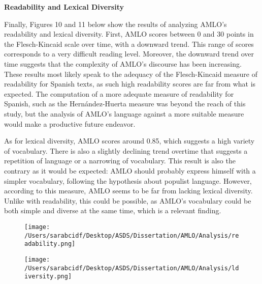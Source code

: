 \documentclass[]{article}
\begin{document}
\noindent\textbf{Readability and Lexical Diversity}
\vspace{.5cm}

Finally, Figures 10 and 11 below show the results of analyzing AMLO's readability and lexical diversity. First, AMLO scores between 0 and 30 points in the Flesch-Kincaid scale over time, with a downward trend. This range of scores corresponds to a very difficult reading level. Moreover, the downward trend over time suggests that the complexity of AMLO's discourse has been increasing. These results most likely speak to the adequacy of the Flesch-Kincaid measure of readability for Spanish texts, as such high readability scores are far from what is expected. The computation of a more adequate measure of readability for Spanish, such as the Hernández-Huerta measure was beyond the reach of this study, but the analysis of AMLO's language against a more suitable measure would make a productive future endeavor. 

As for lexical diversity, AMLO scores around 0.85, which suggests a high variety of vocabulary. There is also a slightly declining trend overtime that suggests a repetition of language or a narrowing of vocabulary. This result is also the contrary as it would be expected: AMLO should probably express himself with a simpler vocabulary, following the hypothesis about populist language. However, according to this measure, AMLO seems to be far from lacking lexical diversity. Unlike with readability, this could be possible, as AMLO's vocabulary could be both simple and diverse at the same time, which is a relevant finding. 

\newpage
\vspace*{\fill}
\begin{figure}[H]
	\centering
	\caption{\label{}}
	\texttt{[image: /Users/sarabcidf/Desktop/ASDS/Dissertation/AMLO/Analysis/readability.png]}
\end{figure}

\begin{figure}[H]
	\centering
	\caption{\label{}}
	\texttt{[image: /Users/sarabcidf/Desktop/ASDS/Dissertation/AMLO/Analysis/ldiversity.png]}
\end{figure}

\vspace*{\fill}
\end{document}
